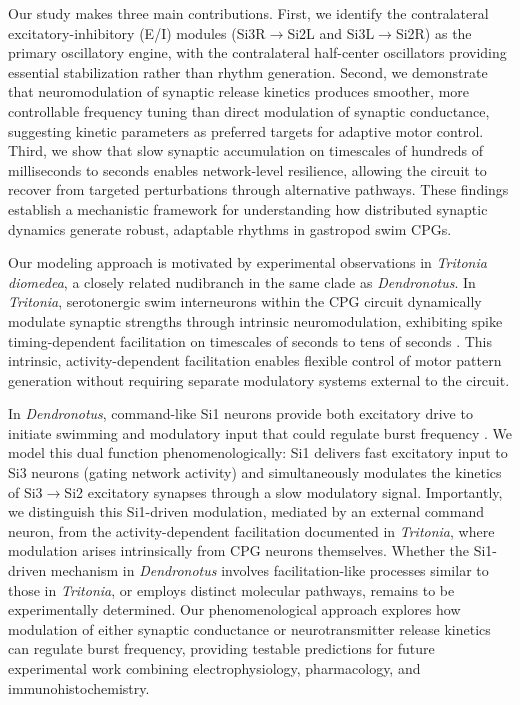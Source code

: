 \documentclass[nofootinbib,aip,amsmath,amssymb,preprint,twocolumn,floatfix,10pt]{revtex4-2}
\begin{document}
Our study makes three main contributions. First, we identify the contralateral excitatory-inhibitory (E/I) modules (Si3R$\to$Si2L and Si3L$\to$Si2R) as the primary oscillatory engine, with the contralateral half-center oscillators providing essential stabilization rather than rhythm generation. Second, we demonstrate that neuromodulation of synaptic release kinetics produces smoother, more controllable frequency tuning than direct modulation of synaptic conductance, suggesting kinetic parameters as preferred targets for adaptive motor control. Third, we show that slow synaptic accumulation on timescales of hundreds of milliseconds to seconds enables network-level resilience, allowing the circuit to recover from targeted perturbations through alternative pathways. These findings establish a mechanistic framework for understanding how distributed synaptic dynamics generate robust, adaptable rhythms in gastropod swim CPGs.

Our modeling approach is motivated by experimental observations in \textit{Tritonia diomedea}, a closely related nudibranch in the same clade as \textit{Dendronotus}. In \textit{Tritonia}, serotonergic swim interneurons within the CPG circuit dynamically modulate synaptic strengths through intrinsic neuromodulation, exhibiting spike timing-dependent facilitation on timescales of seconds to tens of seconds \cite{katz1994dynamic, sakurai2003spike}. This intrinsic, activity-dependent facilitation enables flexible control of motor pattern generation without requiring separate modulatory systems external to the circuit.

In \textit{Dendronotus}, command-like Si1 neurons provide both excitatory drive to initiate swimming and modulatory input that could regulate burst frequency \cite{sakurai2019command}. We model this dual function phenomenologically: Si1 delivers fast excitatory input to Si3 neurons (gating network activity) and simultaneously modulates the kinetics of Si3$\to$Si2 excitatory synapses through a slow modulatory signal. Importantly, we distinguish this Si1-driven modulation, mediated by an external command neuron, from the activity-dependent facilitation documented in \textit{Tritonia}, where modulation arises intrinsically from CPG neurons themselves. Whether the Si1-driven mechanism in \textit{Dendronotus} involves facilitation-like processes similar to those in \textit{Tritonia}, or employs distinct molecular pathways, remains to be experimentally determined. Our phenomenological approach explores how modulation of either synaptic conductance or neurotransmitter release kinetics can regulate burst frequency, providing testable predictions for future experimental work combining electrophysiology, pharmacology, and immunohistochemistry.
\end{document}
